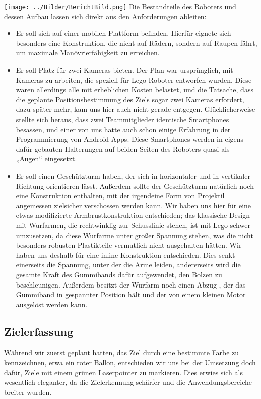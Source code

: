 \documentclass[12pt,a4paper]{article}
\newcommand*\circled[1]{\tikz[baseline=(char.base)]{
            \node[color=blue,shape=circle,draw,inner sep=2pt] (char) {#1};}}
\begin{document}
\texttt{[image: ../Bilder/BerichtBild.png]} 
Die Bestandteile des Roboters und dessen Aufbau lassen sich direkt aus den Anforderungen ableiten:
\begin{itemize}
\item
Er soll sich auf einer mobilen Plattform befinden. Hierfür eignete sich besonders eine Konstruktion, die nicht auf Rädern, sondern auf Raupen fährt, um maximale Manövrierfähigkeit zu erreichen. \circled{1}
\item
Er soll Platz für zwei Kameras \circled{2} bieten. Der Plan war ursprünglich, mit Kameras zu arbeiten, die speziell für Lego-Roboter entworfen wurden. Diese waren allerdings alle mit erheblichen Kosten belastet, und die Tatsache, dass die geplante Positionsbestimmung des Ziels sogar zwei Kameras erfordert, dazu später mehr, kam uns hier auch nicht gerade entgegen. Glücklicherweise stellte sich heraus, dass zwei Teammitglieder identische Smartphones besassen, und einer von uns hatte auch schon einige Erfahrung in der Programmierung von Android-Apps. Diese 	Smartphones werden in eigens dafür gebauten Halterungen auf beiden Seiten des Roboters quasi als „Augen“ eingesetzt.
\item
Er soll einen Geschützturm haben, der sich in horizontaler \circled{3} und in vertikaler \circled{4} Richtung orientieren lässt. Außerdem sollte der Geschützturm natürlich noch eine Konstruktion 	enthalten, mit der irgendeine Form von Projektil angemessen zielsicher verschossen werden kann. Wir haben uns hier für eine etwas modifizierte Armbrustkonstruktion entschieden; das klassische Design mit Wurfarmen, die rechtwinklig zur Schusslinie stehen, ist mit Lego schwer umzusetzen, da diese Wurfarme unter großer Spannung stehen, was die nicht besonders robusten Plastikteile vermutlich nicht ausgehalten hätten. Wir haben uns deshalb für eine inline-Konstruktion \circled{5} entschieden. Dies senkt einerseits die Spannung, unter der die Arme leiden, andererseits wird die gesamte Kraft des Gummibands dafür aufgewendet, den Bolzen zu beschleunigen. Außerdem besitzt der Wurfarm noch einen Abzug \circled{6}, der das Gummiband in gespannter Position hält und der von einem kleinen Motor ausgelöst werden 	kann.
\end{itemize}
\subsection{Zielerfassung}
Während wir zuerst geplant hatten, das Ziel durch eine bestimmte Farbe zu kennzeichnen, etwa ein roter Ballon, entschieden wir uns bei der Umsetzung doch dafür, Ziele mit einem grünen Laserpointer zu markieren. Dies erwies sich als wesentlich eleganter, da die Zielerkennung schärfer und die Anwendungsbereiche breiter wurden. 
\end{document}
